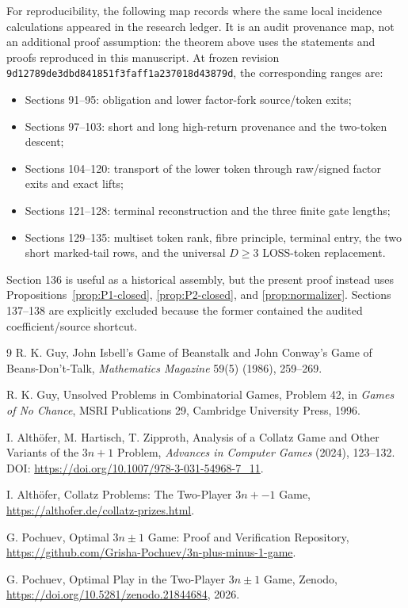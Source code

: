 \documentclass[11pt]{article}
\begin{document}
For reproducibility, the following map records where the same local incidence
calculations appeared in the research ledger.  It is an audit provenance map,
not an additional proof assumption: the theorem above uses the statements and
proofs reproduced in this manuscript.  At frozen revision
\nolinkurl{9d12789de3dbd841851f3faff1a237018d43879d}, the corresponding ranges
are:
\begin{itemize}[leftmargin=*]
\item Sections 91--95: obligation and lower factor-fork source/token exits;
\item Sections 97--103: short and long high-return provenance and the
      two-token descent;
\item Sections 104--120: transport of the lower token through raw/signed
      factor exits and exact lifts;
\item Sections 121--128: terminal reconstruction and the three finite gate
      lengths;
\item Sections 129--135: multiset token rank, fibre principle, terminal entry,
      the two short marked-tail rows, and the universal $D\ge3$ LOSS-token
      replacement.
\end{itemize}
Section 136 is useful as a historical assembly, but the present proof instead
uses Propositions~\ref{prop:P1-closed}, \ref{prop:P2-closed}, and
\ref{prop:normalizer}.  Sections 137--138 are explicitly excluded because the
former contained the audited coefficient/source shortcut.

\begin{thebibliography}{9}
R. K. Guy, John Isbell's Game of Beanstalk and John Conway's Game of
Beans-Don't-Talk, \emph{Mathematics Magazine} 59(5) (1986), 259--269.

R. K. Guy, Unsolved Problems in Combinatorial Games, Problem 42, in
\emph{Games of No Chance}, MSRI Publications 29, Cambridge University Press,
1996.

I. Alth\"ofer, M. Hartisch, T. Zipproth, Analysis of a Collatz Game and Other
Variants of the $3n+1$ Problem, \emph{Advances in Computer Games} (2024),
123--132. DOI: \url{https://doi.org/10.1007/978-3-031-54968-7_11}.

I. Alth\"ofer, Collatz Problems: The Two-Player $3n+-1$ Game,
\url{https://althofer.de/collatz-prizes.html}.

G. Pochuev, Optimal $3n\pm1$ Game: Proof and Verification Repository,
\url{https://github.com/Grisha-Pochuev/3n-plus-minus-1-game}.

G. Pochuev, Optimal Play in the Two-Player $3n\pm1$ Game, Zenodo,
\url{https://doi.org/10.5281/zenodo.21844684}, 2026.
\end{thebibliography}
\end{document}
